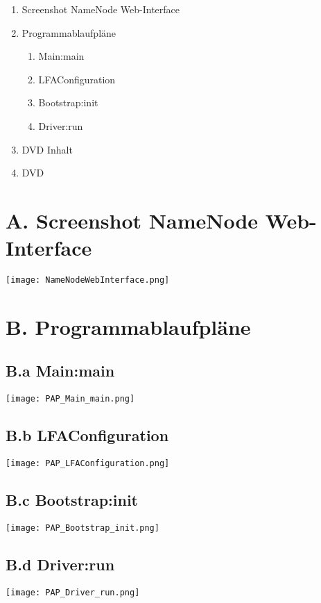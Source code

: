 
\addchap{\langanhang}

{\Large
\begin{enumerate}[label=\Alph*.]
	\item Screenshot NameNode Web-Interface
	\item Programmablaufpläne
	\begin{enumerate}
		\item Main:main
		\item LFAConfiguration
		\item Bootstrap:init
		\item Driver:run
	\end{enumerate}
	\item DVD Inhalt
	\item DVD 
\end{enumerate}
}
\pagebreak

\section*{A. Screenshot NameNode Web-Interface}\label{sec:ScreenNameNodeWeb}
\texttt{[image: NameNodeWebInterface.png]}
\pagebreak

\section*{B. Programmablaufpläne}

\subsection*{B.a Main:main}\label{subsec:PAPMainMain}
\centering
\texttt{[image: PAP\_Main\_main.png]}
\pagebreak

\subsection*{B.b LFAConfiguration}\label{subsec:PAPLFAConfiguration}
\centering
\texttt{[image: PAP\_LFAConfiguration.png]}
\pagebreak

\subsection*{B.c Bootstrap:init}\label{subsec:PAPBootstrapInit}
\centering
\texttt{[image: PAP\_Bootstrap\_init.png]}
\pagebreak

\subsection*{B.d Driver:run}\label{subsec:PAPDriverRun}
\centering
\texttt{[image: PAP\_Driver\_run.png]}
\pagebreak

